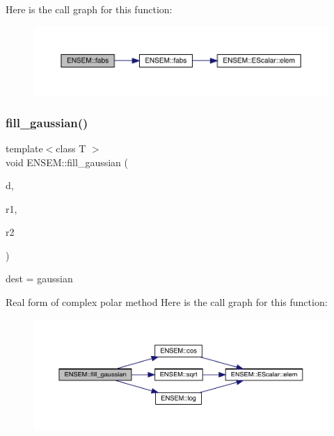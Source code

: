 Here is the call graph for this function\+:\nopagebreak
\begin{figure}[H]
\begin{center}
\leavevmode
\includegraphics[width=350pt]{d9/ded/group__rscalar_ga4f8b1e156677c7d98bb51e70915b9239_cgraph}
\end{center}
\end{figure}
\mbox{\label{group__rscalar_gaaefd5c2ab83b53fd225f3198277789f3}} 
\subsubsection{\texorpdfstring{fill\_gaussian()}{fill\_gaussian()}}
{\footnotesize\ttfamily template$<$class T $>$ \\
void E\+N\+S\+E\+M\+::fill\+\_\+gaussian (\begin{DoxyParamCaption}\item[{\mbox{\hyperlink{classENSEM_1_1RScalar}{R\+Scalar}}$<$ T $>$ \&}]{d,  }\item[{\mbox{\hyperlink{classENSEM_1_1RScalar}{R\+Scalar}}$<$ T $>$ \&}]{r1,  }\item[{\mbox{\hyperlink{classENSEM_1_1RScalar}{R\+Scalar}}$<$ T $>$ \&}]{r2 }\end{DoxyParamCaption})\hspace{0.3cm}{\ttfamily [inline]}}



dest = gaussian 

Real form of complex polar method Here is the call graph for this function\+:\nopagebreak
\begin{figure}[H]
\begin{center}
\leavevmode
\includegraphics[width=350pt]{d9/ded/group__rscalar_gaaefd5c2ab83b53fd225f3198277789f3_cgraph}
\end{center}
\end{figure}
\mbox{\label{group__rscalar_ga02bacd2a18d81f6f0e7d137a7d21ee23}} 
